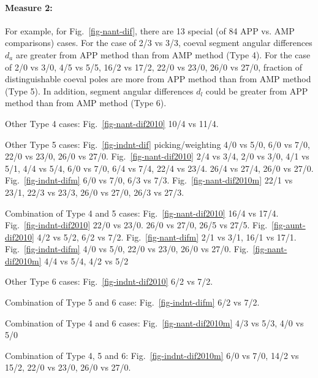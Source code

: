 \paragraph{Measure 2:}

For example, for Fig.~\ref{fig-nant-dif}, there are 13 special (of 84 APP vs.
AMP comparisons) cases. For the case of 2/3 vs 3/3, coeval segment angular
differences $d_a$ are greater from APP method than from AMP method (Type 4). For
the case of 2/0 vs 3/0, 4/5 vs 5/5, 16/2 vs 17/2, 22/0 vs
23/0, 26/0 vs 27/0, fraction of
distinguishable coeval poles are more from APP method than from AMP method (Type
5). In addition, segment angular differences $d_l$ could be greater from APP
method than from AMP method (Type 6).

Other Type 4 cases: Fig.~\ref{fig-nant-dif2010} 10/4 vs 11/4.

Other Type 5 cases: Fig.~\ref{fig-indnt-dif} picking/weighting 4/0
vs 5/0, 6/0 vs 7/0, 22/0 vs
23/0, 26/0 vs 27/0.
Fig.~\ref{fig-nant-dif2010} 2/4 vs 3/4, 2/0
vs 3/0, 4/1 vs 5/1, 4/4 vs 5/4, 6/0 vs 7/0,
6/4 vs 7/4, 22/4 vs 23/4. 26/4 vs 27/4, 26/0 vs 27/0.
Fig.~\ref{fig-indnt-difm} 6/0 vs 7/0, 6/3 vs
7/3. Fig.~\ref{fig-nant-dif2010m} 22/1 vs 23/1, 22/3 vs
23/3, 26/0 vs 27/0, 26/3 vs
27/3.

Combination of Type 4 and 5 cases: Fig.~\ref{fig-nant-dif2010} 16/4 vs 17/4.
Fig.~\ref{fig-indnt-dif2010} 22/0 vs 23/0.
26/0 vs 27/0, 26/5 vs 27/5. Fig.~\ref{fig-aunt-dif2010}
4/2 vs 5/2, 6/2 vs 7/2. Fig.~\ref{fig-nant-difm} 2/1 vs 3/1, 16/1 vs
17/1. Fig.~\ref{fig-indnt-difm} 4/0 vs 5/0,
22/0 vs 23/0, 26/0 vs 27/0.
Fig.~\ref{fig-nant-dif2010m} 4/4 vs 5/4, 4/2 vs 5/2

Other Type 6 cases: Fig.~\ref{fig-indnt-dif2010} 6/2 vs 7/2.

Combination of Type 5 and 6 case: Fig.~\ref{fig-indnt-difm} 6/2 vs 7/2.

Combination of Type 4 and 6 cases: Fig.~\ref{fig-nant-dif2010m} 4/3 vs 5/3, 4/0
vs 5/0

Combination of Type 4, 5 and 6: Fig.~\ref{fig-indnt-dif2010m} 6/0 vs
7/0, 14/2 vs 15/2, 22/0 vs 23/0,
26/0 vs 27/0.


